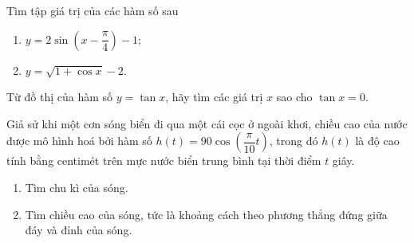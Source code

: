 \begin{bt}%
	Tìm tập giá trị của các hàm số sau
	\begin{multicols}{2}
		\begin{enumerate}
			\item   $y=2 \sin \left(x-\dfrac{\pi}{4}\right)-1$;
			\item   $y=\sqrt{1+\cos x}-2$.
		\end{enumerate}
	\end{multicols}
\end{bt}

\begin{bt}%
	Từ đồ thị của hàm số $y=\tan x$, hãy tìm các giá trị $x$ sao cho $\tan x=0$.
\end{bt}

\begin{bt}%
	Giả sử khi một cơn sóng biển đi qua một cái cọc ở ngoài khơi, chiều cao của nước được mô hình hoá bởi hàm số $h(t)=90 \cos \left(\dfrac{\pi}{10} t\right)$, trong đó $h(t)$ là độ cao tính bằng centimét trên mực nước biển trung bình tại thời điểm $t$ giây.
	\begin{enumerate}
		\item   Tìm chu kì của sóng.
		\item    Tìm chiều cao của sóng, tức là khoảng cách theo phương thẳng đứng giữa đáy và đỉnh của sóng.
	\end{enumerate}
\end{bt}
